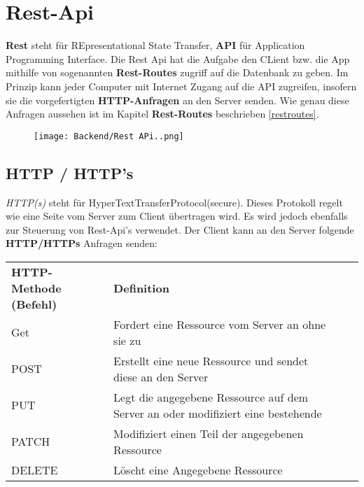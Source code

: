 \section{Rest-Api}
\label{restapi}

\textbf{Rest} steht für REpresentational State Transfer, \textbf{API} für Application
Programming Interface. Die Rest Api hat die Aufgabe den CLient bzw. die App
mithilfe von sogenannten \textbf{Rest-Routes} zugriff auf die Datenbank zu geben.
Im Prinzip kann jeder Computer mit Internet Zugang auf die API zugreifen, insofern
sie die vorgefertigten \textbf{HTTP-Anfragen} an den Server senden. Wie genau diese
Anfragen aussehen ist im Kapitel \textbf{Rest-Routes} beschrieben \ref*{restroutes}.

\begin{figure}[H]
    \begin{center}
        \texttt{[image: Backend/Rest APi..png]}
    \end{center}
\end{figure}

\subsection{HTTP / HTTP's}
\textit{HTTP(s)} steht für HyperTextTransferProtocol(secure).
Dieses Protokoll regelt wie eine Seite vom Server zum Client übertragen wird.
Es wird jedoch ebenfalls zur Steuerung von Rest-Api's verwendet. Der Client
kann an den Server folgende \textbf{HTTP/HTTPs} Anfragen senden:

\begin{table}
    \centering
    \begin{tabular}{llll}
        \textbf{HTTP-Methode (Befehl)} & \textbf{Definition}                                                              &  & \\
        Get                            & Fordert eine Ressource vom Server an ohne sie zu                                 &  & \\
        POST                           & Erstellt eine neue Ressource und sendet diese an den Server                      &  & \\
        PUT                            & Legt die angegebene Ressource auf dem Server an oder modifiziert eine bestehende &  & \\
        PATCH                          & Modifiziert einen Teil der angegebenen Ressource                                 &  & \\
        DELETE                         & Löscht eine Angegebene Ressource                                                 &  &
    \end{tabular}
\end{table}
